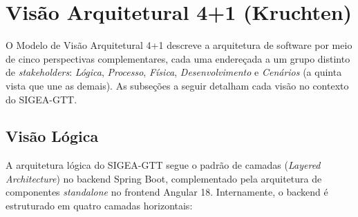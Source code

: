 \begin{figure}[htb]
\end{figure}

\section{Visão Arquitetural 4+1 (Kruchten)}
\label{sec_arq_41}

O Modelo de Visão Arquitetural 4+1 \cite{kruchten1995} descreve a
arquitetura de software por meio de cinco perspectivas complementares,
cada uma endereçada a um grupo distinto de \textit{stakeholders}:
\textit{Lógica}, \textit{Processo}, \textit{Física},
\textit{Desenvolvimento} e \textit{Cenários} (a quinta vista que une
as demais). As subseções a seguir detalham cada visão no contexto do
SIGEA-GTT.

\subsection{Visão Lógica}
\label{subsec_visao_logica}

A arquitetura lógica do SIGEA-GTT segue o padrão de camadas
(\textit{Layered Architecture}) no backend Spring Boot, complementado
pela arquitetura de componentes \textit{standalone} no frontend Angular 18.
Internamente, o backend é estruturado em quatro camadas horizontais:

